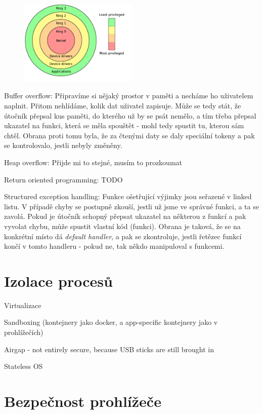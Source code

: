 \begin{figure}[ht!]
\centering
\includegraphics[width=0.5\textwidth]{BSY/img/kernel-rings.png}
\end{figure}

Buffer overflow: Připravíme si nějaký prostor v paměti a necháme ho uživatelem naplnit. Přitom nehlídáme, kolik dat uživatel zapisuje. Může se tedy stát, že útočník přepsal kus paměti, do kterého už by se psát nemělo, a tím třeba přepsal ukazatel na funkci, která se měla spouštět - mohl tedy spustit tu, kterou sám chtěl. Obrana proti tomu byla, že za čtenými daty se daly speciální tokeny a pak se kontrolovalo, jestli nebyly změněny.

Heap overflow: Přijde mi to stejné, musím to prozkoumat

Return oriented programming: TODO

Structured exception handling: Funkce ošetřující výjimky jsou seřazené v linked listu. V případě chyby se postupně zkouší, jestli už jsme ve správné funkci, a ta se zavolá. Pokud je útočník schopný přepsat ukazatel na některou z funkcí a pak vyvolat chybu, může spustit vlastní kód (funkci). Obrana je taková, že se na konkrétní místo dá \textit{default handler}, a pak se zkontroluje, jestli řetězec funkcí končí v tomto handleru - pokud ne, tak někdo manipuloval s funkcemi.


\section{Izolace procesů}

Virtualizace

Sandboxing (kontejnery jako docker, a app-specific kontejnery jako v prohlížečích)

Airgap - not entirely secure, because USB sticks are still brought in

Stateless OS



\section{Bezpečnost prohlížeče}

